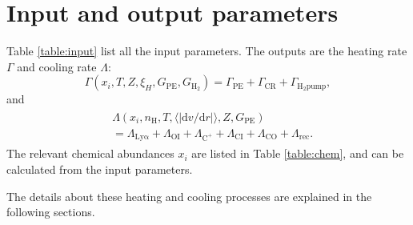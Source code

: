 \documentclass[iop,numberedappendix]{emulateapj}
\newcommand{\di}{\mathrm{d}}
\newcommand{\mr}{\mathrm}
\newcommand{\Ht}{\mathrm{H_2}}
\newcommand{\Ho}{\mathrm{H}}
\newcommand{\CO}{\mathrm{CO}}
\newcommand{\CI}{\mathrm{CI}}
\newcommand{\OI}{\mathrm{OI}}
\newcommand{\Cplus}{\mathrm{C^+}}
\begin{document}
\section{Input and output parameters}\label{section:para}
Table \ref{table:input} list all the input parameters. The outputs are the
heating rate $\Gamma$ and cooling rate $\Lambda$:
\begin{equation}\label{eq:heating}
    \Gamma(x_i, T, Z, \xi_H, G_\mr{PE}, G_\Ht) = \Gamma_\mr{PE} + \Gamma_\mr{CR} +
    \Gamma_\mr{H_2 pump},
\end{equation}
and
\begin{align}\label{eq:cooling}
    \begin{split}
    &\Lambda(x_i, n_\Ho, T, \langle |\di v/\di r| \rangle, Z, G_\mr{PE}) \\
    &= \Lambda_\mr{Ly\alpha}+\Lambda_\OI + \Lambda_\Cplus +
    \Lambda_\CI + \Lambda_\CO + \Lambda_\mr{rec}.
    \end{split}
\end{align}
The relevant chemical abundances $x_i$ are listed in Table \ref{table:chem},
and can be calculated from the input parameters.

The details about these heating and cooling processes are explained in the
following sections.
\end{document}
